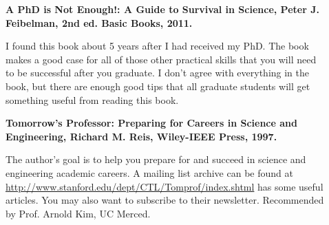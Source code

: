 \documentclass[11pt]{article}
\begin{document}
\begin{description}
\item[] {\bf A PhD is Not Enough!: A Guide to Survival in Science, Peter J. Feibelman, 2nd ed. Basic Books, 2011.} 

I found this book about 5 years after I had received my PhD.  The book makes a good case for all of those other practical skills that you will need to be successful after you graduate.  I don't agree with everything in the book, but there are enough good tips that all graduate students will get something useful from reading this book.

\item[] {\bf Tomorrow's Professor: Preparing for Careers in Science and Engineering, Richard M. Reis, Wiley-IEEE Press, 1997.}  

The author's goal is to help you prepare for and succeed in science and engineering academic careers. A mailing list archive can be found at \url{http://www.stanford.edu/dept/CTL/Tomprof/index.shtml} has some useful articles. You may also want to subscribe to their newsletter.  Recommended by Prof. Arnold Kim, UC Merced. 

\end{description}
\end{document}
